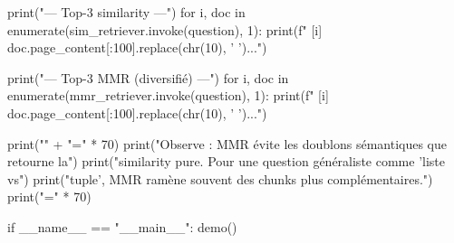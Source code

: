 \documentclass[11pt,a4paper]{article}
\begin{document}
\begin{pythoncode}
    print("\n--- Top-3 similarity ---")
    for i, doc in enumerate(sim_retriever.invoke(question), 1):
        print(f"  [{i}] {doc.page_content[:100].replace(chr(10), ' ')}...")

    print("\n--- Top-3 MMR (diversifié) ---")
    for i, doc in enumerate(mmr_retriever.invoke(question), 1):
        print(f"  [{i}] {doc.page_content[:100].replace(chr(10), ' ')}...")

    print("\n" + "=" * 70)
    print("Observe : MMR évite les doublons sémantiques que retourne la")
    print("similarity pure. Pour une question généraliste comme 'liste vs")
    print("tuple', MMR ramène souvent des chunks plus complémentaires.")
    print("=" * 70)

if __name__ == "__main__":
    demo()
\end{pythoncode}
\end{document}
